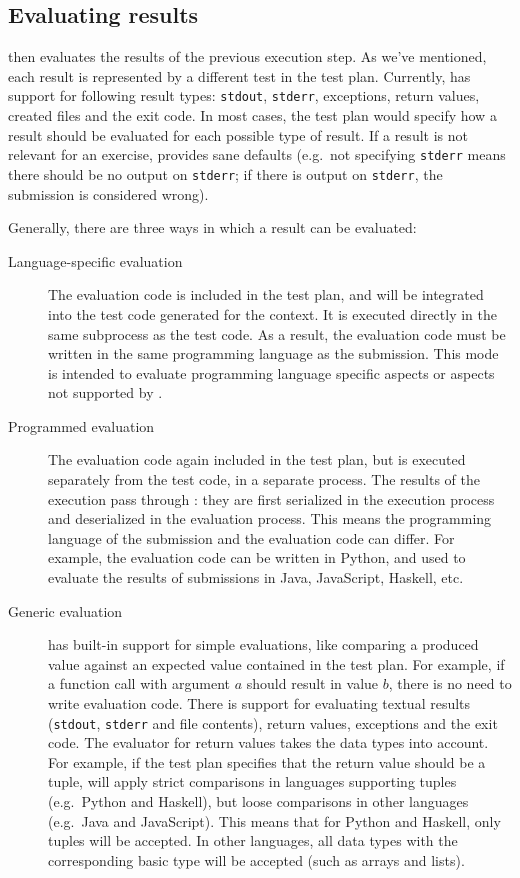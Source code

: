 \documentclass[5p,number]{elsarticle}
\begin{document}
    \subsection{Evaluating results}\label{subsec:evaluating-the-results}
    
    \tested{} then evaluates the results of the previous execution step.
    As we've mentioned, each result is represented by a different test in the test plan.
    Currently, \tested{} has support for following result types: \texttt{stdout}, \texttt{stderr}, exceptions, return values, created files and the exit code.
    In most cases, the test plan would specify how a result should be evaluated for each possible type of result.
    If a result is not relevant for an exercise, \tested{} provides sane defaults (e.g.\ not specifying \texttt{stderr} means there should be no output on \texttt{stderr}; if there is output on \texttt{stderr}, the submission is considered wrong).

    Generally, there are three ways in which a result can be evaluated:
    \begin{description}
        \item[Language-specific evaluation] The evaluation code is included in the test plan, and will be integrated into the test code generated for the context.
        It is executed directly in the same subprocess as the test code.
        As a result, the evaluation code must be written in the same programming language as the submission.
        This mode is intended to evaluate programming language specific aspects or aspects not supported by \tested{}.
        \item[Programmed evaluation] The evaluation code again included in the test plan, but is executed separately from the test code, in a separate process.
        The results of the execution pass through \tested{}: they are first serialized in the execution process and deserialized in the evaluation process.
        This means the programming language of the submission and the evaluation code can differ.
        For example, the evaluation code can be written in Python, and used to evaluate the results of submissions in Java, JavaScript, Haskell, etc.
        \item[Generic evaluation] \tested{} has built-in support for simple evaluations, like comparing a produced value against an expected value contained in the test plan.
        For example, if a function call with argument $a$ should result in value $b$, there is no need to write evaluation code.
        There is support for evaluating textual results (\texttt{stdout}, \texttt{stderr} and file contents), return values, exceptions and the exit code.
        The evaluator for return values takes the data types into account.
        For example, if the test plan specifies that the return value should be a tuple, \tested{} will apply strict comparisons in languages supporting tuples (e.g.\ Python and Haskell), but loose comparisons in other languages (e.g.\ Java and JavaScript).
        This means that for Python and Haskell, only tuples will be accepted.
        In other languages, all data types with the corresponding basic type will be accepted (such as arrays and lists).
    \end{description}
\end{document}
